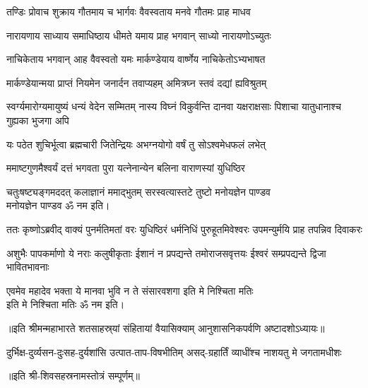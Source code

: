 \twolineshloka
{तण्डिः प्रोवाच शुक्राय गौतमाय च भार्गवः}
{वैवस्वताय मनवे गौतमः प्राह माधव}%

\twolineshloka
{नारायणाय साध्याय समाधिष्ठाय धीमते}
{यमाय प्राह भगवान् साध्यो नारायणोऽच्युतः}%

\twolineshloka
{नाचिकेताय भगवान् आह वैवस्वतो यमः}
{मार्कण्डेयाय वार्ष्णेय नाचिकेतोऽभ्यभाषत}%

\twolineshloka
{मार्कण्डेयान्मया प्राप्तं नियमेन जनार्दन}
{तवाप्यहम् अमित्रघ्न स्तवं दद्यां ह्यविश्रुतम्}%



\threelineshloka
{स्वर्ग्यमारोग्यमायुष्यं धन्यं वेदेन सम्मितम्}
{नास्य विघ्नं विकुर्वन्ति दानवा यक्षराक्षसाः}
{पिशाचा यातुधानाश्च गुह्यका भुजगा अपि}%

\twolineshloka
{यः पठेत शुचिर्भूत्वा ब्रह्मचारी जितेन्द्रियः}
{अभग्नयोगो वर्षं तु सोऽश्वमेधफलं लभेत्}%

\twolineshloka
{ममाष्टगुणमैश्वर्यं दत्तं भगवता पुरा}
{यत्नेनान्येन बलिना वाराणस्यां युधिष्ठिर}%


\twolineshloka
{चतुःषष्ट्यङ्गमददत् कलाज्ञानं ममाद्भुतम्}
{सरस्वत्यास्तटे तुष्टो मनोयज्ञेन पाण्डव}\mbox{}\\[-1.6em]%
मनोयज्ञेन पाण्डव ॐ नम इति।

\threelineshloka
{ततः कृष्णोऽब्रवीद् वाक्यं पुनर्मतिमतां वरः}
{युधिष्ठिरं धर्मनिधिं पुरुहूतमिवेश्वरः}
{उपमन्युर्मयि प्राह तपन्निव दिवाकरः}%

\threelineshloka
{अशुभैः पापकर्माणो ये नराः कलुषीकृताः}
{ईशानं न प्रपद्यन्ते तमोराजसवृत्तयः}
{ईश्वरं सम्प्रपद्यन्ते द्विजा भावितभावनाः}%


\twolineshloka
{एवमेव महादेव भक्ता ये मानवा भुवि}
{न ते संसारवशगा इति मे निश्चिता मतिः}\mbox{}\\[-1.6em]%
इति मे निश्चिता मतिः ॐ नम इति।

॥इति श्रीमन्महाभारते शतसाहस्र्यां संहितायां वैयासिक्याम् आनुशासनिकपर्वणि अष्टादशोऽध्यायः॥

{दुर्भिक्ष-दुर्व्यसन-दुःसह-दुर्यशांसि}
{उत्पात-ताप-विषभीतिम् असद्‌-ग्रहार्तिं}
{व्याधींश्च नाशयतु मे जगतामधीशः}

॥इति श्री-शिवसहस्रनामस्तोत्रं सम्पूर्णम्॥

\hyperref[sec:start_ShivaSahasranamaStotram]{\closesection}